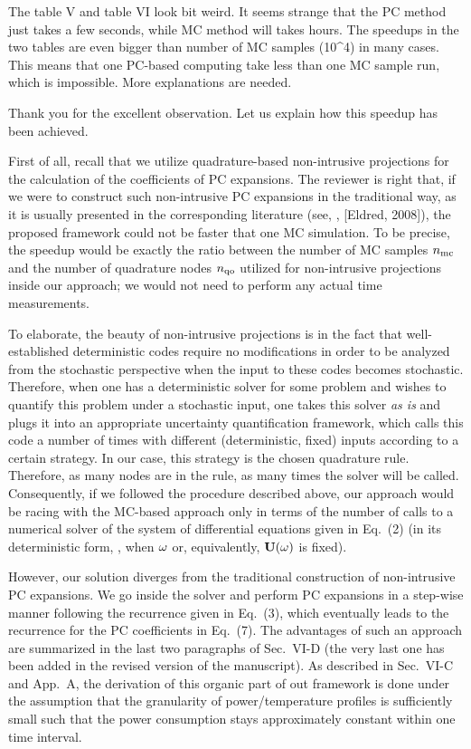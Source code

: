 \begin{reviewer}
The table V and table VI look  bit weird.  It seems strange that the PC method just takes a few seconds, while MC method will takes hours. The speedups in the two tables  are even bigger than number of MC samples (10\^{}4) in many cases. This means that one PC-based computing take less than one MC sample run, which is impossible.  More explanations are needed.
\end{reviewer}
\begin{authors}
Thank you for the excellent observation.
Let us explain how this speedup has been achieved.

First of all, recall that we utilize quadrature-based non-intrusive projections for the calculation of the coefficients of PC expansions.
The reviewer is right that, if we were to construct such non-intrusive PC expansions in the traditional way, as it is usually presented in the corresponding literature (see, \eg, [Eldred, 2008]), the proposed framework could not be faster that one MC simulation.
To be precise, the speedup would be exactly the ratio between the number of MC samples ${n_\text{mc}}$ and the number of quadrature nodes ${n_\text{qo}}$ utilized for non-intrusive projections inside our approach; we would not need to perform any actual time measurements.

To elaborate, the beauty of non-intrusive projections is in the fact that well-established deterministic codes require no modifications in order to be analyzed from the stochastic perspective when the input to these codes becomes stochastic.
Therefore, when one has a deterministic solver for some problem and wishes to quantify this problem under a stochastic input, one takes this solver \emph{as is} and plugs it into an appropriate uncertainty quantification framework, which calls this code a number of times with different (deterministic, fixed) inputs according to a certain strategy.
In our case, this strategy is the chosen quadrature rule.
Therefore, as many nodes are in the rule, as many times the solver will be called.
Consequently, if we followed the procedure described above, our approach would be racing with the MC-based approach only in terms of the number of calls to a numerical solver of the system of differential equations given in Eq.~(2) (in its deterministic form, \ie, when $\omega$ or, equivalently, $\mathbf{U}(\omega)$ is fixed).

However, our solution diverges from the traditional construction of non-intrusive PC expansions.
We go inside the solver and perform PC expansions in a step-wise manner following the recurrence given in Eq.~(3), which eventually leads to the recurrence for the PC coefficients in Eq.~(7).
The advantages of such an approach are summarized in the last two paragraphs of Sec.~VI-D (the very last one has been added in the revised version of the manuscript).
As described in Sec.~VI-C and App.~A, the derivation of this organic part of out framework is done under the assumption that the granularity of power/temperature profiles is sufficiently small such that the power consumption stays approximately constant within one time interval.


\end{authors}

